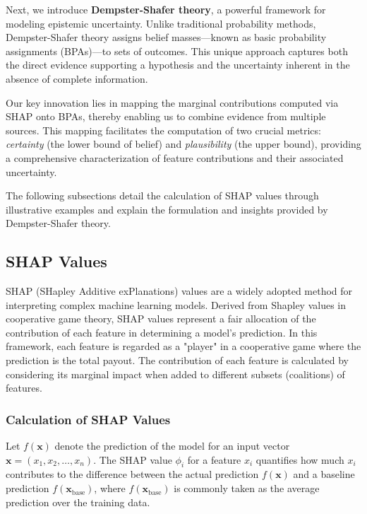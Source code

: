\documentclass[acmlarge]{acmart}
\begin{document}
Next, we introduce \textbf{Dempster-Shafer theory}, a powerful framework for modeling epistemic uncertainty. Unlike traditional probability methods, Dempster-Shafer theory assigns belief masses—known as basic probability assignments (BPAs)—to sets of outcomes. This unique approach captures both the direct evidence supporting a hypothesis and the uncertainty inherent in the absence of complete information.

Our key innovation lies in mapping the marginal contributions computed via SHAP onto BPAs, thereby enabling us to combine evidence from multiple sources. This mapping facilitates the computation of two crucial metrics: \textit{certainty} (the lower bound of belief) and \textit{plausibility} (the upper bound), providing a comprehensive characterization of feature contributions and their associated uncertainty.

The following subsections detail the calculation of SHAP values through illustrative examples and explain the formulation and insights provided by Dempster-Shafer theory.


\subsection{SHAP Values}

SHAP (SHapley Additive exPlanations) values are a widely adopted method for interpreting complex machine learning models. Derived from Shapley values in cooperative game theory, SHAP values represent a fair allocation of the contribution of each feature in determining a model's prediction. In this framework, each feature is regarded as a "player" in a cooperative game where the prediction is the total payout. The contribution of each feature is calculated by considering its marginal impact when added to different subsets (coalitions) of features.

\subsubsection{Calculation of SHAP Values}

Let \( f(\mathbf{x}) \) denote the prediction of the model for an input vector \( \mathbf{x} = (x_1, x_2, \dots, x_n) \). The SHAP value \( \phi_i \) for a feature \( x_i \) quantifies how much \( x_i \) contributes to the difference between the actual prediction \( f(\mathbf{x}) \) and a baseline prediction \( f(\mathbf{x}_{\text{base}}) \), where \( f(\mathbf{x}_{\text{base}}) \) is commonly taken as the average prediction over the training data.
\end{document}
